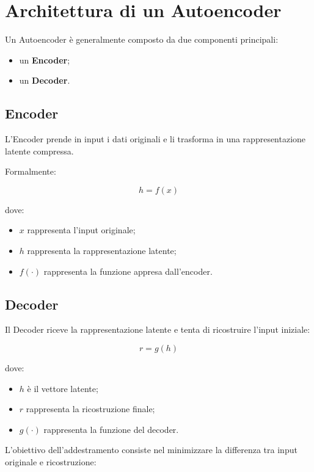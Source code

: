 \section{Architettura di un Autoencoder}

Un Autoencoder è generalmente composto da due componenti principali:

\begin{itemize}
    \item un \textbf{Encoder};
    \item un \textbf{Decoder}.
\end{itemize}

\subsection{Encoder}

L'Encoder prende in input i dati originali e li trasforma in una rappresentazione latente compressa.

Formalmente:

\[
h = f(x)
\]

dove:

\begin{itemize}
    \item $x$ rappresenta l'input originale;
    \item $h$ rappresenta la rappresentazione latente;
    \item $f(\cdot)$ rappresenta la funzione appresa dall'encoder.
\end{itemize}

\subsection{Decoder}

Il Decoder riceve la rappresentazione latente e tenta di ricostruire l'input iniziale:

\[
r = g(h)
\]

dove:

\begin{itemize}
    \item $h$ è il vettore latente;
    \item $r$ rappresenta la ricostruzione finale;
    \item $g(\cdot)$ rappresenta la funzione del decoder.
\end{itemize}

L'obiettivo dell'addestramento consiste nel minimizzare la differenza tra input originale e ricostruzione:

